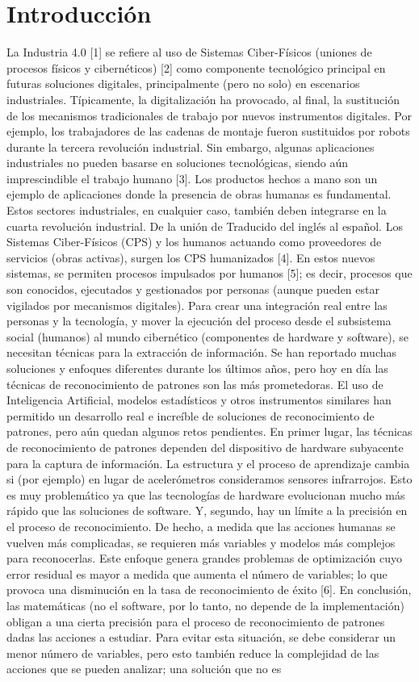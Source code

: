 \documentclass[10pt]{article}
\begin{document}
\section{Introducción}
La Industria 4.0 [1] se refiere al uso de Sistemas Ciber-Físicos (uniones de procesos físicos y cibernéticos) [2] como componente tecnológico principal en futuras soluciones digitales, principalmente (pero no solo) en escenarios industriales. Típicamente, la digitalización ha provocado, al final, la sustitución de los mecanismos tradicionales de trabajo por nuevos instrumentos digitales. Por ejemplo, los trabajadores de las cadenas de montaje fueron sustituidos por robots durante la tercera revolución industrial. Sin embargo, algunas aplicaciones industriales no pueden basarse en soluciones tecnológicas, siendo aún imprescindible el trabajo humano [3]. Los productos hechos a mano son un ejemplo de aplicaciones donde la presencia de obras humanas es fundamental. Estos sectores industriales, en cualquier caso, también deben integrarse en la cuarta revolución industrial. De la unión de Traducido del inglés al español. Los Sistemas Ciber-Físicos (CPS) y los humanos actuando como proveedores de servicios (obras activas), surgen los CPS humanizados [4]. En estos nuevos sistemas, se permiten procesos impulsados por humanos [5]; es decir, procesos que son conocidos, ejecutados y gestionados por personas (aunque pueden estar vigilados por mecanismos digitales). Para crear una integración real entre las personas y la tecnología, y mover la ejecución del proceso desde el subsistema social (humanos) al mundo cibernético (componentes de hardware y software), se necesitan técnicas para la extracción de información. Se han reportado muchas soluciones y enfoques diferentes durante los últimos años, pero hoy en día las técnicas de reconocimiento de patrones son las más prometedoras. El uso de Inteligencia Artificial, modelos estadísticos y otros instrumentos similares han permitido un desarrollo real e increíble de soluciones de reconocimiento de patrones, pero aún quedan algunos retos pendientes. En primer lugar, las técnicas de reconocimiento de patrones dependen del dispositivo de hardware subyacente para la captura de información. La estructura y el proceso de aprendizaje cambia si (por ejemplo) en lugar de acelerómetros consideramos sensores infrarrojos. Esto es muy problemático ya que las tecnologías de hardware evolucionan mucho más rápido que las soluciones de software. Y, segundo, hay un límite a la precisión en el proceso de reconocimiento. De hecho, a medida que las acciones humanas se vuelven más complicadas, se requieren más variables y modelos más complejos para reconocerlas. Este enfoque genera grandes problemas de optimización cuyo error residual es mayor a medida que aumenta el número de variables; lo que provoca una disminución en la tasa de reconocimiento de éxito [6]. En conclusión, las matemáticas (no el software, por lo tanto, no depende de la implementación) obligan a una cierta precisión para el proceso de reconocimiento de patrones dadas las acciones a estudiar. Para evitar esta situación, se debe considerar un menor número de variables, pero esto también reduce la complejidad de las acciones que se pueden analizar; una solución que no es 
\end{document}
